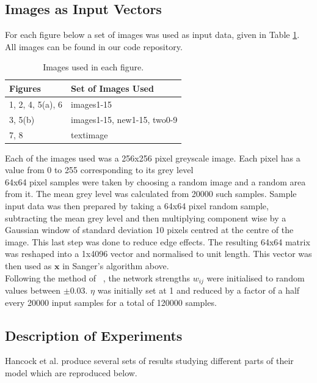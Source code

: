 \subsection{Images as Input Vectors}

For each figure below a set of images was used as input data, given in Table \ref{tab:Table 1}. All images can be found in our code repository. 
\begin{table}[h]
    \centering
    \begin{tabular}{ll}
    \hline
    Figures&Set of Images Used\\
    \hline
    1, 2, 4, 5(a), 6&images1-15\\
    3, 5(b)&images1-15, new1-15, two0-9\\
    7, 8&textimage\\
    \hline
    \end{tabular}
    \caption{Images used in each figure.}
    \label{tab:Table 1}
\end{table}
Each of the images used was a 256x256 pixel greyscale image. Each pixel has a value from 0 to 255 corresponding to its grey level\\
64x64 pixel samples were taken by choosing a random image and a random area from it. The mean grey level was calculated from 20000 such samples. Sample input data was then prepared by taking a 64x64 pixel random sample, subtracting the mean grey level and then multiplying component wise by a Gaussian window of standard deviation 10 pixels centred at the centre of the image. This last step was done to reduce edge effects. The resulting 64x64 matrix was reshaped into a 1x4096 vector and normalised to unit length. This vector was then used as $\textbf{x}$ in Sanger's algorithm above.\\
Following the method of ~\cite{Hancock1992-mp}, the network strengths $w_{ij}$ were initialised to random values between $\pm 0.03$. $\eta$ was initially set at 1 and reduced by a factor of a half every 20000 input samples for a total of 120000 samples.

\subsection{Description of Experiments}
Hancock et al. produce several sets of results studying different parts of their model which are reproduced below.

